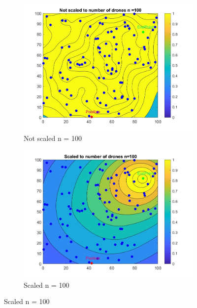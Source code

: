 \begin{figure}[h]
\begin{subfigure}[b]{0.43\textwidth}
         \centering
         \includegraphics[width=\textwidth]{figures/RewardFunctionNotscaled100.jpg}
         \caption{Not scaled n = 100}
         \end{subfigure}
         \begin{subfigure}[b]{0.43\textwidth}
         \centering
         \includegraphics[width=\textwidth]{figures/RewardFunctionscaled100.jpg}
         \caption{Scaled n = 100}
         \end{subfigure}
\end{figure}